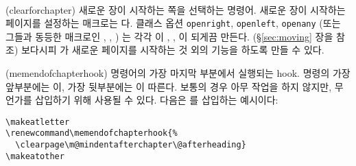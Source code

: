 \begin{syntax}
\cmd{\clearforchapter} \\
\end{syntax}
\glossary(clearforchapter)%
  {}%
  {새로운 장이 시작하는 쪽을 선택하는 명령어.}
새로운 장이 시작하는 페이지를 설정하는 매크로는 \cmd{\clearforchapter}다.
클래스 옵션 \texttt{openright}, \texttt{openleft}, \texttt{openany}
(또는 그들과 동등한 매크로인 \cmd{\openright}, \cmd{\openleft}, \cmd{\openany})
는 각각 \cmd{\clearforchapter} 이
\cmd{\cleartorecto}, \cmd{\cleartoverso}, \cmd{\clearpage} 이 되게끔 만든다.
(\S\ref{sec:moving} 장을 참조)
보다시피 \cmd{\clearforchapter}가 새로운 페이지를 시작하는 것 외의 기능을 하도록 만들 수 있다.

\begin{syntax}
\cmd{\memendofchapterhook} 
\end{syntax}
\glossary(memendofchapterhook)%
  {}%
  { 명령어의 가장 마지막 부분에서 실행되는 hook.}
\cmd{\chapter} 명령의 가장 앞부분에는 \cmd{\clearforchapter}이,
가장 뒷부분에는 \cmd{\memendofchapterhook}이 따른다.
보통의 경우 아무 작업을 하지 않지만, 무언가를 삽입하기 위해 사용될 수 있다.
다음은 \cmd{\clearpage}를 삽입하는 예시이다:
\begin{verbatim}
\makeatletter
\renewcommand\memendofchapterhook{%
  \clearpage\m@mindentafterchapter\@afterheading}
\makeatother
\end{verbatim}



